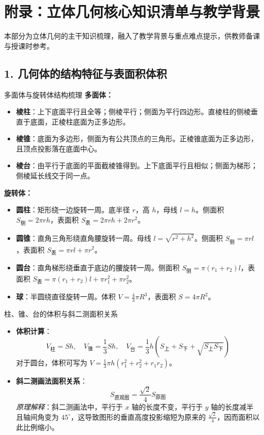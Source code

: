 \documentclass[11pt,a4paper]{ctexart}
\begin{document}
\section*{附录：立体几何核心知识清单与教学背景}

本部分为立体几何的主干知识梳理，融入了教学背景与重点难点提示，供教师备课与授课时参考。

\subsection*{1. 几何体的结构特征与表面积体积}

\begin{teachbox}{多面体与旋转体结构梳理}
\textbf{多面体：}
\begin{itemize}
  \item \textbf{棱柱}：上下底面平行且全等；侧棱平行；侧面为平行四边形。直棱柱的侧棱垂直于底面，正棱柱底面为正多边形。
  \item \textbf{棱锥}：底面为多边形，侧面为有公共顶点的三角形。正棱锥底面为正多边形，且顶点投影落在底面中心。
  \item \textbf{棱台}：由平行于底面的平面截棱锥得到。上下底面平行且相似；侧面为梯形；侧棱延长线交于同一点。
\end{itemize}
\textbf{旋转体：}
\begin{itemize}
  \item \textbf{圆柱}：矩形绕一边旋转一周。底半径 $r$，高 $h$，母线 $l = h$。侧面积 $S_{\text{侧}} = 2\pi rh$，表面积 $S_{\text{表}} = 2\pi rh + 2\pi r^2$。
  \item \textbf{圆锥}：直角三角形绕直角腰旋转一周。母线 $l = \sqrt{r^2 + h^2}$。侧面积 $S_{\text{侧}} = \pi rl$，表面积 $S_{\text{表}} = \pi rl + \pi r^2$。
  \item \textbf{圆台}：直角梯形绕垂直于底边的腰旋转一周。侧面积 $S_{\text{侧}} = \pi(r_1+r_2)l$，表面积 $S_{\text{表}} = \pi(r_1+r_2)l + \pi r_1^2 + \pi r_2^2$。
  \item \textbf{球}：半圆绕直径旋转一周。体积 $V = \frac{4}{3}\pi R^3$，表面积 $S = 4\pi R^2$。
\end{itemize}
\end{teachbox}

\begin{teachbox}{柱、锥、台的体积与斜二测面积关系}
\begin{itemize}
  \item \textbf{体积计算}：
    \[ V_{\text{柱}} = Sh, \quad V_{\text{锥}} = \frac{1}{3}Sh, \quad V_{\text{台}} = \frac{1}{3}h(S_{\text{上}} + S_{\text{下}} + \sqrt{S_{\text{上}}S_{\text{下}}}) \]
    对于圆台，体积可写为 $V = \frac{1}{3}\pi h(r_1^2 + r_2^2 + r_1 r_2)$。
  \item \textbf{斜二测画法面积关系}：
    \[ S_{\text{直观图}} = \frac{\sqrt{2}}{4} S_{\text{原图}} \]
    \textit{原理解释}：斜二测画法中，平行于 $x$ 轴的长度不变，平行于 $y$ 轴的长度减半且轴间角变为 $45^\circ$，这导致图形的垂直高度投影缩短为原来的 $\frac{\sqrt{2}}{4}$，因而面积以此比例缩小。
\end{itemize}
\end{teachbox}
\end{document}
